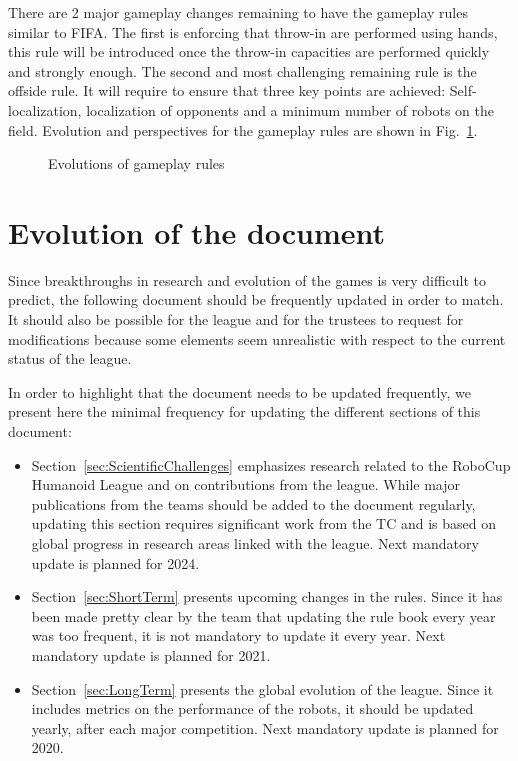 \documentclass{article}
\begin{document}
There are 2 major gameplay changes remaining to have the gameplay rules similar to FIFA.
The first is enforcing that throw-in are performed using hands,
this rule will be introduced once the throw-in capacities are performed quickly and
strongly enough.
The second and most challenging remaining rule is the offside rule.
It will require to ensure that three key points are achieved:
Self-localization, localization of opponents and a minimum number of robots on the field.
Evolution and perspectives for the gameplay rules are shown in Fig.~\ref{fig:gameplay_rules}.

\begin{figure}
  \centering
  
  \caption{\label{fig:gameplay_rules}Evolutions of gameplay rules}
\end{figure}


\section{Evolution of the document}

Since breakthroughs in research and evolution of the games is very difficult to predict,
the following document should be frequently updated in order to match.
It should also be possible for the league and for the trustees to request for
modifications because some elements seem unrealistic with respect to the current
status of the league.

In order to highlight that the document needs to be updated frequently, we present
here the minimal frequency for updating the different sections of this document:
\begin{itemize}
\item Section~\ref{sec:ScientificChallenges} emphasizes research related to
  the RoboCup Humanoid League and on contributions from the league.
  While major publications from the teams should be added to the document regularly,
  updating this section requires significant work from the TC and is based on
  global progress in research areas linked with the league.
  Next mandatory update is planned for 2024.
\item Section~\ref{sec:ShortTerm} presents upcoming changes in the rules.
  Since it has been made pretty clear by the team that updating the rule book
  every year was too frequent,
  it is not mandatory to update it every year.
  Next mandatory update is planned for 2021.
\item Section~\ref{sec:LongTerm} presents the global evolution of the league.
  Since it includes metrics on the performance of the robots,
  it should be updated yearly, after each major competition.
  Next mandatory update is planned for 2020.
\end{itemize}
\end{document}
